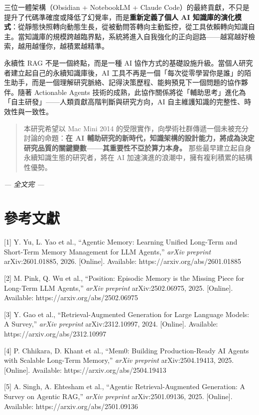 三位一體架構（Obsidian + NotebookLM + Claude
Code）的最終貢獻，不只是提升了代碼準確度或降低了幻覺率，而是\textbf{重新定義了個人
AI
知識庫的演化模式}：從靜態快照轉向動態生長，從被動問答轉向主動監控，從工具依賴轉向知識自主。當知識庫的規模跨越臨界點，系統將進入自我強化的正向迴路------越寫越好檢索，越用越懂你，越積累越精準。

永續性 RAG 不是一個終點，而是一種 AI
協作方式的基礎設施升級。當個人研究者建立起自己的永續知識庫後，AI
工具不再是一個「每次從零學習你是誰」的陌生助手，而是一個理解研究脈絡、記得決策歷程、能夠預見下一個問題的協作夥伴。隨著
Actionable Agents
技術的成熟，此協作關係將從「輔助思考」進化為「自主研發」------人類貢獻高階判斷與研究方向，AI
自主維護知識的完整性、時效性與一致性。

\begin{quote}
本研究希望以 Mac Mini 2014
的受限實作，向學術社群傳遞一個未被充分討論的命題：\textbf{在 AI
輔助研究的新時代，知識架構的設計能力，將成為決定研究品質的關鍵變數------其重要性不亞於算力本身。}
那些最早建立起自身永續知識生態的研究者，將在 AI
加速演進的浪潮中，擁有複利積累的結構性優勢。
\end{quote}

\emph{--- 全文完 ---}

\section{參考文獻}\label{ux53c3ux8003ux6587ux737b}

{[}1{]} Y. Yu, L. Yao et al., ``Agentic Memory: Learning Unified
Long-Term and Short-Term Memory Management for LLM Agents,'' \emph{arXiv
preprint} arXiv:2601.01885, 2026. {[}Online{]}. Available:
https://arxiv.org/abs/2601.01885

{[}2{]} M. Pink, Q. Wu et al., ``Position: Episodic Memory is the
Missing Piece for Long-Term LLM Agents,'' \emph{arXiv preprint}
arXiv:2502.06975, 2025. {[}Online{]}. Available:
https://arxiv.org/abs/2502.06975

{[}3{]} Y. Gao et al., ``Retrieval-Augmented Generation for Large
Language Models: A Survey,'' \emph{arXiv preprint} arXiv:2312.10997,
2024. {[}Online{]}. Available: https://arxiv.org/abs/2312.10997

{[}4{]} P. Chhikara, D. Khant et al., ``Mem0: Building Production-Ready
AI Agents with Scalable Long-Term Memory,'' \emph{arXiv preprint}
arXiv:2504.19413, 2025. {[}Online{]}. Available:
https://arxiv.org/abs/2504.19413

{[}5{]} A. Singh, A. Ehtesham et al., ``Agentic Retrieval-Augmented
Generation: A Survey on Agentic RAG,'' \emph{arXiv preprint}
arXiv:2501.09136, 2025. {[}Online{]}. Available:
https://arxiv.org/abs/2501.09136

